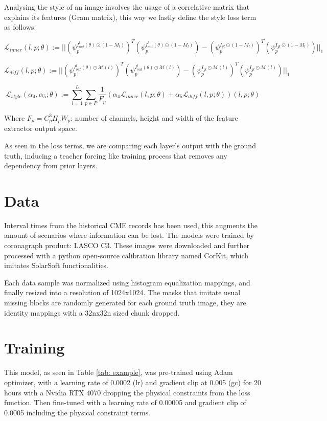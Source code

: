\documentclass[draft]{agujournal2019}
\begin{document}
Analysing the style of an image involves the usage of a correlative matrix that explains its features (Gram matrix), this way we lastly define the style loss term as follows:

\begin{equation}
    \mathcal{L}_{inner} (l, p; \theta) := ||(\psi_p^{I_{out}^l(\theta) \odot (1-M_l)})^T(\psi_p^{I_{out}^l(\theta) \odot (1-M_l)}) - (\psi_p^{I_{gt}\odot (1-M_l)})^T(\psi_p^{I_{gt}\odot (1-M_l)})||_1
\end{equation}

\begin{equation}
    \mathcal{L}_{diff} (l, p; \theta) := ||(\psi_p^{I_{out}^l(\theta) \odot \mathcal{M}(l)})^T(\psi_p^{I_{out}^l(\theta) \odot \mathcal{M}(l)}) - (\psi_p^{I_{gt} \odot \mathcal{M}(l)})^T(\psi_p^{I_{gt} \odot \mathcal{M}(l)})||_1
\end{equation}

\begin{equation}
    \mathcal{L}_{style}(\alpha_4, \alpha_5;\theta) := \sum_{l = 1}^L \sum_{p \in P} \frac{1}{F_p} (\alpha_4\mathcal{L}_{inner}(l, p; \theta) + \alpha_5\mathcal{L}_{diff}(l, p; \theta))(l, p; \theta)
\end{equation}

 Where $F_p = C_p^3H_pW_p$: number of channels, height and width of the feature extractor output space.

 As seen in the loss terms, we are comparing each layer's output with the ground truth, inducing a teacher forcing like training process that removes any dependency from prior layers.

\section{Data}
Interval times from the historical CME records has been used, this augments the amount of scenarios where information can be lost. The models were trained by coronagraph product: LASCO C3. These images were downloaded and further processed with a python open-source calibration library named CorKit, which imitates SolarSoft functionalities.

Each data sample was normalized using histogram equalization mappings, and finally resized into a resolution of 1024x1024. The masks that imitate usual missing blocks are randomly generated for each ground truth image, they are identity mappings with a 32nx32n sized chunk dropped.

\section{Training}
This model, as seen in Table \ref{tab: example}, was pre-trained using Adam optimizer, with a learning rate of 0.0002 (lr) and gradient clip at 0.005 (gc) for 20 hours with a Nvidia RTX 4070 dropping the physical constraints from the loss function. Then fine-tuned with a learning rate of 0.00005 and gradient clip of 0.0005 including the physical constraint terms.
\end{document}
